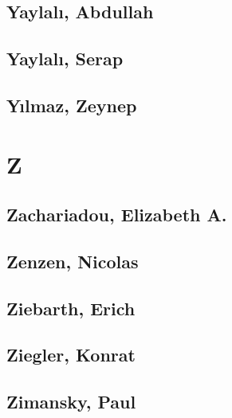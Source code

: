 
\subsection[Yaylalı, Abdullah (1)]{Yaylalı, Abdullah}

\subsection[Yaylalı, Serap (1)]{Yaylalı, Serap}

\subsection[Yılmaz, Zeynep (1)]{Yılmaz, Zeynep}

\section{Z}

\subsection[Zachariadou, Elizabeth A. (1)]{Zachariadou, Elizabeth A.}

\subsection[Zenzen, Nicolas (1)]{Zenzen, Nicolas}

\subsection[Ziebarth, Erich (1)]{Ziebarth, Erich}

\subsection[Ziegler, Konrat (1)]{Ziegler, Konrat}

\subsection[Zimansky, Paul (1)]{Zimansky, Paul}

